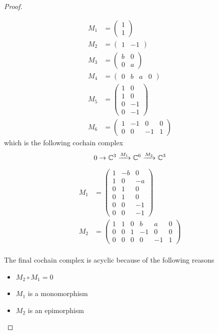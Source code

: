 \begin{proof}
\begin{enumerate}[label = (\roman*)]
\begin{align*}
M_1 &=
\begin{pmatrix}
 1\\
 1
\end{pmatrix}
\\
M_2 &= 
\begin{pmatrix} 
1 & -1
\end{pmatrix}
\\
M_3 &= 
\begin{pmatrix} 
b & 0 \\ 
0 & a 
\end{pmatrix}
\\
M_4 &= 
\begin{pmatrix} 
0 & b & a & 0
\end{pmatrix}
\\
M_5 &= 
\begin{pmatrix} 
1 & 0 \\ 
1 & 0 \\
0 & -1 \\ 
0 & -1 
\end{pmatrix}
\\
M_6 &= 
\begin{pmatrix} 
1 & -1 & 0 & 0 \\ 
0 & 0 & -1 & 1
\end{pmatrix}
\end{align*}
which is the following cochain complex
\[
0 \rightarrow \mathbb{C}^3 \xrightarrow{M_1} \mathbb{C}^6 \xrightarrow{M_2} \mathbb{C}^3
\]
\begin{align*}
M_1 &= 
\begin{pmatrix} 
1 & -b & 0 \\
1 & 0 & -a \\ 
0 & 1 & 0 \\
0 & 1 & 0 \\
0 & 0 & -1 \\
0 & 0 & -1 
\end{pmatrix}
\\
M_2 &= 
\begin{pmatrix} 
1 & 1 & 0 & b & a & 0 \\ 
0 & 0 & 1 & -1 & 0 & 0 \\
0 & 0 & 0 & 0 & -1 & 1
\end{pmatrix}
\end{align*}
\\The final cochain complex is acyclic because of the following reasons
\begin{itemize}
\item $M_2\circ M_1 =0$
\item $M_1$ is a monomorphism
\item $M_2$ is an epimorphism
\end{itemize} 
\end{enumerate}
\end{proof}

